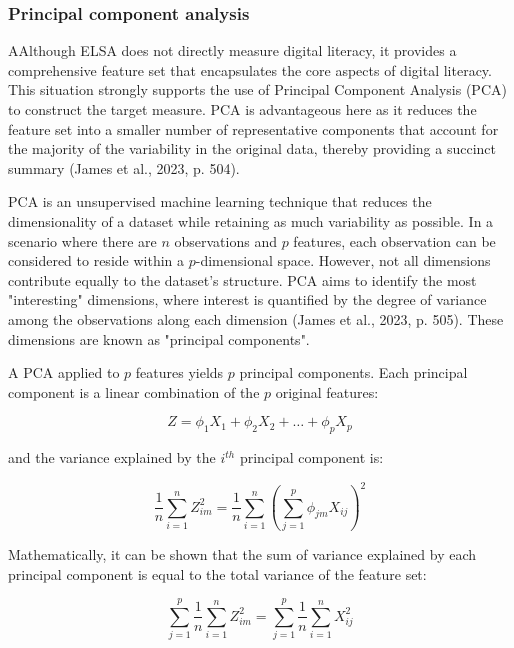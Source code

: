 \subsubsection{Principal component analysis}
AAlthough ELSA does not directly measure digital literacy, it provides a comprehensive feature set that encapsulates the core aspects of digital literacy. This situation strongly supports the use of Principal Component Analysis (PCA) to construct the target measure. PCA is advantageous here as it reduces the feature set into a smaller number of representative components that account for the majority of the variability in the original data, thereby providing a succinct summary (James et al., 2023, p. 504). 

PCA is an unsupervised machine learning technique that reduces the dimensionality of a dataset while retaining as much variability as possible. In a scenario where there are $n$ observations and $p$ features, each observation can be considered to reside within a $p$-dimensional space. However, not all dimensions contribute equally to the dataset's structure. PCA aims to identify the most "interesting" dimensions, where interest is quantified by the degree of variance among the observations along each dimension (James et al., 2023, p. 505). These dimensions are known as "principal components".

A PCA applied to $p$ features yields $p$ principal components. Each principal component is a linear combination of the $p$ original features:

\begin{equation}
    \label{eq:pca_loadings}
    Z = \phi_{1}X_1 + \phi_{2}X_2 + \ldots + \phi_{p}X_p
\end{equation}

and the variance explained by the $i^{th}$ principal component is:

\begin{equation}
    \label{eq:pca_variance}
    \frac{1}{n} \sum_{i=1}^{n}Z_{im}^2 = \frac{1}{n} \sum_{i=1}^{n} \left( \sum_{j=1}^{p} \phi_{jm}X_{ij} \right)^2
\end{equation}

Mathematically, it can be shown that the sum of variance explained by each principal component is equal to the total variance of the feature set:

\begin{equation}
    \label{eq:pca_total_variance}
    \sum_{j=1}^{p} \frac{1}{n} \sum_{i=1}^{n}Z_{im}^2 = \sum_{j=1}^{p} \frac{1}{n} \sum_{i=1}^{n}X_{ij}^2
\end{equation}

